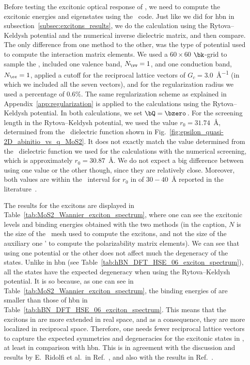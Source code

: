 Before testing the excitonic optical response of , we need to compute the excitonic energies and eigenstates using the \xatu~code.
Just like we did for \gls{hbn} in subsection~\ref{subsec:excitons_results}, we do the calculation using the Rytova--Keldysh potential and the numerical inverse dielectric matrix, and then compare.
The only difference from one method to the other, was the type of potential used to compute the interaction matrix elements.
We used a $60\times60$ $\bk$-grid to sample the \bz, included one valence band, $N_{\vv}=1$, and one conduction band, $N_{\cc}=1$, applied a cutoff for the reciprocal lattice vectors of $G_c = 3.0$~\unit{\angstrom^{-1}} (in which we included all the seven vectors), and for the regularization radius we used a percentage of $0.6\%$.
The same regularization scheme as explained in Appendix~\ref{app:regularization} is applied to the calculations using the Rytova--Keldysh potential.
In both calculations, we set $\bQ=\bzero$\,.
For the screening length in the Rytova--Keldysh potential, we used the value $r_0 = 31.74$~\unit{\angstrom}, determined from the \bd~dielectric function shown in Fig.~\ref{fig:epsilon_quasi-2D_abinitio_vs_q_MoS2}.
It does not exactly match the value determined from the \bd~dielectric function we used for the calculations with the numerical screening, which is approximately $r_0 = 30.87$~\unit{\angstrom}.
We do not expect a big difference between using one value or the other though, since they are relatively close.
Moreover, both values are within the \abinit~interval for $r_0$ in  of $30-40$~\unit{\angstrom} reported in the literature~\cite{Berkelbach_Hybertsen_Reichman_2013}.

The results for the excitons are displayed in Table~\ref{tab:MoS2_Wannier_exciton_spectrum}, where one can see the excitonic levels and binding energies obtained with the two methods (in the caption, $N$ is the size of the \bz~mesh used to compute the excitons, and not the size of the auxiliary one \bz' to compute the polarizability matrix elements).
We can see that using one potential or the other does not affect much the degeneracy of the states.
Unlike in \gls{hbn} (see Table~\ref{tab:hBN_DFT_HSE_06_exciton_spectrum}), all the states have the expected degeneracy when using the Rytova--Keldysh potential.
It is so because, as one can see in Table~\ref{tab:MoS2_Wannier_exciton_spectrum}, the binding energies of  are smaller than those of \gls{hbn} in Table~\ref{tab:hBN_DFT_HSE_06_exciton_spectrum}.
This means that the excitons in  are more extended in real space, and as a consequence, they are more localized in reciprocal space.
Therefore, one needs fewer reciprocal lattice vectors to capture the expected symmetries and degeneracies for the excitonic states in , at least in comparison with \gls{hbn}.
This is in agreement with the discussion and results by E.~Ridolfi et al.~in Ref.~\cite{Ridolfi_2015}, and also with the results in Ref.~\cite{Xatu}.

